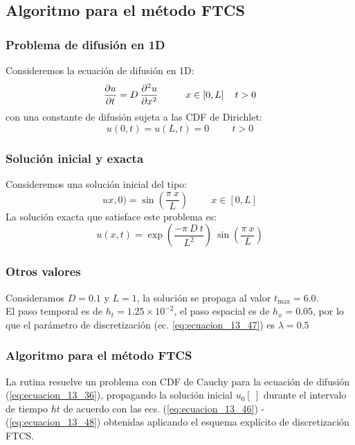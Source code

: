 \documentclass[12pt]{beamer}
\begin{document}
\subsection{Algoritmo para el método FTCS}
\begin{frame}
\frametitle{Problema de difusión en 1D}
Consideremos la ecuación de difusión en 1D:
\begin{equation}
\dfrac{\partial u}{\partial t} =  D \: \dfrac{\partial^{2} u}{\partial x^{2}} \hspace{1cm} x \in [0, L] \hspace{0.4cm} t > 0
\label{eq:ecuacion_13_51}
\end{equation}
con una constante de difusión sujeta a las CDF de Dirichlet:
\begin{equation}
u(0, t) = u(L, t) = 0 \hspace{1cm} t > 0
\label{eq:ecuacion_13_52}
\end{equation}
\end{frame}
\begin{frame}
\frametitle{Solución inicial y exacta}
Consideremos una solución inicial del tipo:
\begin{equation}
u x, 0) = \sin \left( \dfrac{\pi \: x}{L} \right) \hspace{1cm} x \in [0, L]
\label{eq:ecuacion_13_53}
\end{equation}
\pause
La solución exacta que satisface este problema es:
\begin{equation}
u(x, t) = \exp \left( \dfrac{- \pi \: D \: t}{L^{2}} \right) \: \sin \left( \dfrac{\pi \: x}{L} \right)
\end{equation}
\end{frame}
\begin{frame}
\frametitle{Otros valores}
Consideramos $D = 0.1$ y $L = 1$, la solución se propaga al valor $t_{\text{max}}=6.0$.
\\
\bigskip
El paso temporal es de $h_{t}=1.25 \times 10^{-2}$, el paso espacial es de $h_{x} = 0.05$, por lo que el parámetro de discretización (ec. \ref{eq:ecuacion_13_47}) es $\lambda=0.5$
\end{frame}
\begin{frame}
\frametitle{Algoritmo para el método FTCS}
La rutina  resuelve un problema con CDF de Cauchy para la ecuación de difusión (\ref{eq:ecuacion_13_36}), propagando la solución inicial $u_0[ \ ]$ durante el intervalo de tiempo $ht$ de acuerdo con las ecs. (\ref{eq:ecuacion_13_46}) - (\ref{eq:ecuacion_13_48}) obtenidas aplicando el esquema explícito de discretización FTCS.
\end{frame}
\end{document}
